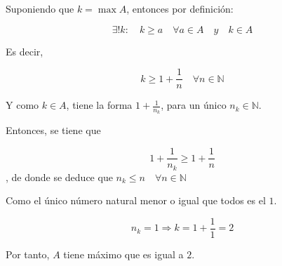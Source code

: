 \documentclass[11pt]{article}
\theoremstyle{plain}
\theoremstyle{definition}
\theoremstyle{remark}
\begin{document}
Suponiendo que \(k=\max A\), entonces por definición:

\[\exists! k:\quad k \geq a \quad \forall a \in A \quad y \quad k \in A\]

Es decir,

\[ k \geq 1 + \frac{1}{n} \quad \forall n \in \mathbb{N} \]

Y como \(k \in A\), tiene la forma \(1 + \frac{1}{n_k}\),
para un único \(n_k \in \mathbb{N} \).

Entonces, se tiene que

\[ 1 + \frac{1}{n_k} \geq 1 + \frac{1}{n}\], de donde se deduce que \(n_k \leq n \quad \forall n \in \mathbb{N} \)

Como el único número natural menor o igual que todos es el \(1\).

\[n_k = 1 \Rightarrow k = 1 + \frac{1}{1} = 2\]

Por tanto, $A$ tiene máximo que es igual a \(2\).
\end{document}
